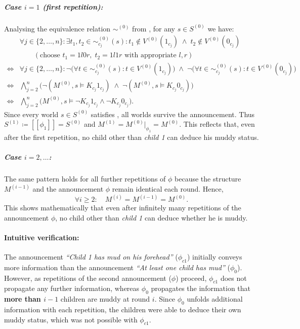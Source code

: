 \subparagraph{Case $i=1$ (first repetition):} 
Analysing the equivalence relation $\sim^{(0)}$ 
from , for any $s \in S^{(0)}$ we have:
\begin{align*}
    &\forall j \in \{2,\dots,n\}: 
        \exists t_1, t_2 \in \sim_{c_j}^{(0)}(s):
            t_1 \notin V^{(0)}(1_{c_j}) \;\land\; t_2 \notin V^{(0)}(0_{c_j}) \\
    &\qquad (\text{choose } t_1 = 1l0r,\; t_2 = 1l1r \text{ with appropriate } l,r) \\
    \iff &\forall j \in \{2,\dots,n\}: 
        \neg\bigl(\forall t \in \sim_{c_j}^{(0)}(s): 
            t \in V^{(0)}(1_{c_j})\bigr)
        \;\land\; 
        \neg\bigl(\forall t \in \sim_{c_j}^{(0)}(s): 
            t \in V^{(0)}(0_{c_j})\bigr) \\
    \iff &\bigwedge_{j=2}^{n} 
        \Big( \neg (M^{(0)},s \models K_{c_j}1_{c_j})
        \;\land\; \neg (M^{(0)},s \models K_{c_j}0_{c_j}) \Big) \\
    \iff &\bigwedge_{j=2}^{n} 
        \big( M^{(0)},s \models \neg K_{c_j}1_{c_j} \land \neg K_{c_j}0_{c_j} \big). 
        \tag{1.2(d4)}\label{eq:1.2(d4)}
\end{align*}
Since every world $s \in S^{(0)}$ satisfies , 
all worlds survive the announcement. 
Thus $S^{(1)} \coloneqq [\![ \phi_1 ]\!] = S^{(0)}$ and 
$M^{(1)} = M^{(0)}|_{\phi_1} = M^{(0)}$. 
This reflects that, even after the first repetition, 
no child other than \emph{child 1} can deduce his muddy status.

\subparagraph{Case $i=2,\dots$:} 
The same pattern holds for all further repetitions of 
$\phi$ because the structure $M^{(i-1)}$ and the announcement 
$\phi$ remain identical each round. Hence,
\[
\forall i \ge 2:\quad M^{(i)} = M^{(i-1)} = M^{(0)}.
\]
This shows mathematically that even after infinitely 
many repetitions of the announcement $\phi$, 
no child other than \emph{child 1} can deduce whether he is muddy.

\paragraph{Intuitive verification:} The announcement 
\emph{``Child 1 has mud on his forehead''} ($\phi_{c1}$) 
initially conveys more information 
than the announcement \emph{``At least one child has mud''} ($\phi_0$). 
However, as repetitions of the second announcement ($\phi$) proceed, 
$\phi_{c1}$ does not propagate any further information, 
whereas $\phi_0$ propagates the information that 
\textbf{more than $i-1$} children are muddy at round $i$. 
Since $\phi_0$ unfolds additional information with each repetition, 
the children were able to deduce their own muddy status, 
which was not possible with $\phi_{c1}$.